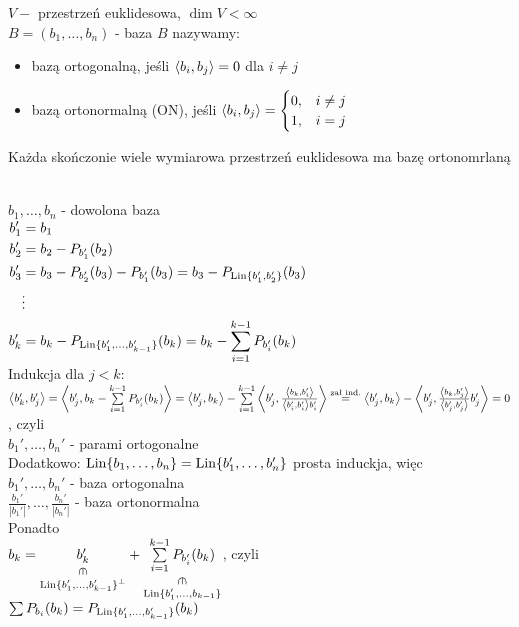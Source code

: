 \begin{df} 
    $V -$ przestrzeń euklidesowa, $\dim V < \infty$ \\ 
    $B = (b_1,\ldots,b_n)$ - baza 
    $B$ nazywamy: 
    \begin{itemize}
        \item bazą ortogonalną, jeśli $\left\langle b_i, b_j \right\rangle = 0$ dla $i \neq j$
        \item bazą ortonormalną (ON), jeśli 
            $\left\langle b_i, b_j \right\rangle = \begin{cases} 0, & i \neq j \\ 1, & i = j \end{cases}$
    \end{itemize} 
\end{df} 
\begin{ft} 
    Każda skończonie wiele wymiarowa przestrzeń euklidesowa ma bazę ortonomrlaną
\end{ft} 
\begin{dd}  ~\\ 
    $b_1,\ldots,b_n$ - dowolona baza \\ 
    $\begin{aligned} 
        b_1' &= b_1 \\ 
        b_2' &= b_2 - P_{b_1'}(b_2) \\ 
        b_3' &= b_3 - P_{b_2'}(b_3)  - P_{b_1'}(b_3) = b_3 - P_{\operatorname{Lin}\{b_1',b_2'\}}(b_3)\\
             &\vdots \\ 
        b_k' &= b_k - P_{\operatorname{Lin}\{b_1',\ldots,b_{k-1}'\}}(b_k) = 
                b_k - \sum\limits_{i=1}^{k-1} P_{b_i'}(b_k)
    \end{aligned}$ \\
    Indukcja dla $j < k$: 
    $\left\langle b_k', b_j' \right\rangle = \left\langle b_j', b_k - \sum\limits_{i=1}^{k-1} P_{b_i'} (b_k) \right\rangle = 
    \left\langle b_j', b_k \right\rangle - \sum\limits_{i=1}^{k-1} \left\langle b_j', \frac{\left\langle b_k, b_i' \right\rangle}
    {\left\langle b_i', b_i' \right\rangle b_i'} \right\rangle \overset{\text{zał ind.}}{=} \left\langle b_j', b_k \right\rangle - 
    \left\langle b_j', \frac{\left\langle b_k, b_j' \right\rangle}{\left\langle b_j', b_j' \right\rangle} b_j' \right\rangle = 0$, czyli \\ 
    $b_1',\ldots,b_n'$ - parami ortogonalne \\ 
    Dodatkowo: 
    $\operatorname{Lin}\{b_1,\ldots,b_n\} = \operatorname{Lin}\{b_1',\ldots,b_n'\}$ prosta induckja, więc \\ 
    $b_1',\ldots,b_n'$ - baza ortogonalna \\ 
    $\frac{b_1'}{|b_1'|},\ldots,\frac{b_n'}{|b_n'|}$ - baza ortonormalna \\ 
    Ponadto \\ 
    $b_k = \underscript{b_k'}{\vertin}{\Lin\{b_1',\ldots,b_{k-1}'\}^\bot} + 
    \underscript{\sum\limits_{i=1}^{k-1} P_{b_i'} (b_k)}{\vertin}{\Lin\{b_1',\ldots,b_{k-1}
    \}}$, czyli \\ 
    $\sum P_{b_i} (b_k) = P_{\operatorname{Lin}\{b_1',\ldots,b_{k-1}'\}} (b_k)$
\end{dd} 
